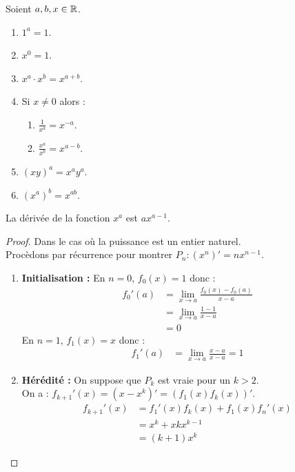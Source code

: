 \begin{proposition}
	Soient $a, b, x \in \mathbb{R}$.
    \begin{enumerate}
            \item $1^a = 1$.
            \item $x^0 = 1$.
            \item $x^a \cdot x^b = x^{a + b}$.
            \item Si $x \neq 0$ alors :
            \begin{enumerate}
            	\item $\frac{1}{x^a} = x^{-a}$.
            	\item $\frac{x^a}{x^b} = x^{a - b}$.
            \end{enumerate}
            \item $(xy)^a = x^a y^a$.
            \item $(x^a)^b = x^{ab}$.
        \end{enumerate}
\end{proposition}

\begin{proposition}
	La dérivée de la fonction $x^a$ est $ax^{a-1}$.
\end{proposition}

\begin{proof}
	Dans le cas où la puissance est un entier naturel. \\
	Procèdons par récurrence pour montrer $P_n : (x^n)' = nx^{n-1}$.
	\begin{enumerate}
		\item \textbf{Initialisation :} En $n = 0$, $f_0(x) = 1$ donc :
		\begin{align*}
			f_0'(a) &= \lim_{x \to a} \frac{f_0(x) - f_0(a)}{x - a} \\
			 &= \lim_{x \to a} \frac{1 - 1}{x - a} \\
			 &= 0
		\end{align*}
		En $n = 1$, $f_1(x) = x$ donc :
		\begin{align*}
			f_1'(a) &= \lim_{x \to a} \frac{x - a}{x - a} = 1
		\end{align*}
		\item \textbf{Hérédité :} On suppose que $P_k$ est vraie pour un $k > 2$. \\
		On a : $f_{k+1}'(x) = (x - x^k)' = (f_1(x) f_k(x))'$.
		\begin{align*}
			f_{k+1}'(x) &= f_1'(x) f_k(x) + f_1(x) f_n'(x) \\
			&= x^k + xkx^{k-1} \\
			&= (k+1)x^k 
		\end{align*}
	\end{enumerate}
\end{proof}


